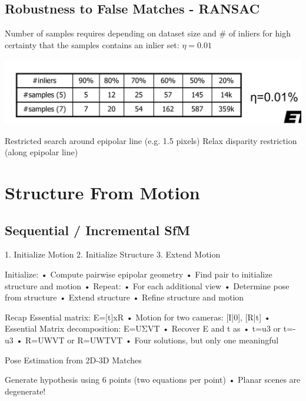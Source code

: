 \subsection{Robustness to False Matches - RANSAC}

Number of samples requires depending on dataset size and \# of inliers for high certainty that the samples contains an inlier set:
$\eta = 0.01$

\includegraphics[width=0.5\columnwidth]{cv_figures/ransac.png}

Restricted search around epipolar line (e.g. 1.5 pixels)
Relax disparity restriction (along epipolar line)


\section{Structure From Motion}
\subsection{Sequential / Incremental SfM}

1. Initialize Motion
2. Initialize Structure
3. Extend Motion

 Initialize:
• Compute pairwise epipolar geometry
• Find pair to initialize structure and motion
• Repeat:
• For each additional view
• Determine pose from structure 
• Extend structure
• Refine structure and motion


Recap Essential matrix: 
E=[t]xR
• Motion for two cameras: [I|0], [R|t]
• Essential Matrix decomposition: E=UΣVT
• Recover E and t as
	• t=u3 or t=-u3
	• R=UWVT or R=UWTVT
• Four solutions, but only one meaningful

Pose Estimation from 2D-3D Matches

Generate hypothesis using 6 points
(two equations per point)
• Planar scenes are degenerate!

